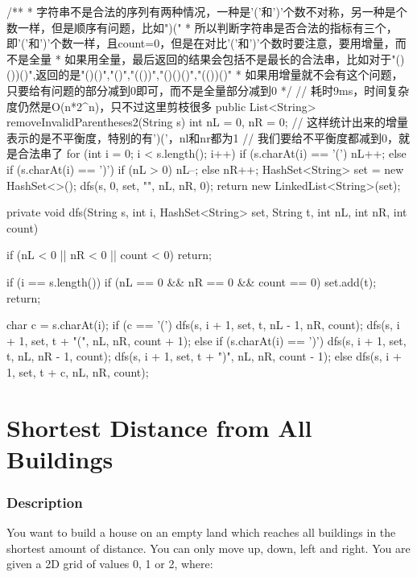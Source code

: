 \begin{Code}
/**
 * 字符串不是合法的序列有两种情况，一种是'('和')'个数不对称，另一种是个数一样，但是顺序有问题，比如")("
 * 所以判断字符串是否合法的指标有三个，即'('和')'个数一样，且count=0，但是在对比'('和')'个数时要注意，要用增量，而不是全量
 * 如果用全量，最后返回的结果会包括不是最长的合法串，比如对于"()())()",返回的是"()()","()","(())","()()()","(())()"
 * 如果用增量就不会有这个问题，只要给有问题的部分减到0即可，而不是全量部分减到0
 */
// 耗时9ms，时间复杂度仍然是O(n*2^n)，只不过这里剪枝很多
public List<String> removeInvalidParentheses2(String s) {
    int nL = 0, nR = 0;
    // 这样统计出来的增量表示的是不平衡度，特别的有')('，nl和nr都为1
    // 我们要给不平衡度都减到0，就是合法串了
    for (int i = 0; i < s.length(); i++) {
        if (s.charAt(i) == '(') {
            nL++;
        } else if (s.charAt(i) == ')') {
            if (nL > 0) {
                nL--;
            } else {
                nR++;
            }
        }
    }
    HashSet<String> set = new HashSet<>();
    dfs(s, 0, set, "", nL, nR, 0);
    return new LinkedList<String>(set);
}

private void dfs(String s, int i, HashSet<String> set, String t, int nL, int nR, int count) {
    if (nL < 0 || nR < 0 || count < 0) {
        return;
    }

    if (i == s.length()) {
        if (nL == 0 && nR == 0 && count == 0) {
            set.add(t);
        }
        return;
    }

    char c = s.charAt(i);
    if (c == '(') {
        dfs(s, i + 1, set, t, nL - 1, nR, count);
        dfs(s, i + 1, set, t + "(", nL, nR, count + 1);
    } else if (s.charAt(i) == ')') {
        dfs(s, i + 1, set, t, nL, nR - 1, count);
        dfs(s, i + 1, set, t + ")", nL, nR, count - 1);
    } else {
        dfs(s, i + 1, set, t + c, nL, nR, count);
    }
}
\end{Code}

\newpage

\section{Shortest Distance from All Buildings} %

\subsubsection{Description}

You want to build a house on an empty land which reaches all buildings in the shortest amount of distance. You can only move up, down, left and right. You are given a 2D grid of values 0, 1 or 2, where:

